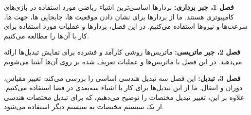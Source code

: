 {\begin{spacing}{1.4}
        \textbf{فصل 1، جبر برداری:} بردارها اساسی‌ترین اشیاء ریاضی مورد استفاده در بازی‌های کامپیوتری هستند.
        ما از بردارها برای نشان دادن موقعیت ها، جابجایی ها، جهت ها، سرعت‌ها و نیروها استفاده می‌کنیم.
        در این فصل، بردارها و عملیات مورد استفاده برای کار با آن‌ها را مطالعه می‌کنیم.

        \textbf{فصل 2، جبر ماتریسی:} ماتریس‌ها روشی کارآمد و فشرده برای نمایش تبدیل‌ها ارائه می‌دهند.
        در این فصل با ماتریس‌ها و عملیات تعریف شده بر روی آن‌ها آشنا می‌شویم.

        \textbf{فصل 3، تبدیل:} این فصل سه تبدیل هندسی اساسی را بررسی می‌کند: تغییر مقیاس، دوران و انتقال.
        ما از این تبدیل‌ها برای کار با اشیاء سه‌بعدی در فضا استفاده می‌کنیم.
        علاوه بر این، تغییر تبدیل مختصات را توضیح می‌دهیم، که برای تبدیل مختصات هندسی از یک سیستم مختصات به سیستم دیگر استفاده می‌شود.
    \end{spacing}
}

\setcounter{chapter}{1}


